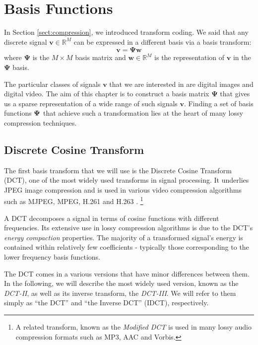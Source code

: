 \chapter{Basis Functions}
\label{ch:dwt}
In Section \ref{sect:compression}, we introduced transform coding.
We said that any discrete signal $\bm v \in \mathbb{R}^M$ can be expressed in a different basis via a basis transform:
\begin{equation*}
  \bm v = \bm\Psi\bm w
\end{equation*}
where $\bm\Psi$ is the $M\times M$ basis matrix and $\bm w \in\mathbb{R}^M$ is the representation of $\bm v$ in the $\bm\Psi$ basis.

The particular classes of signals $\bm v$ that we are interested in are digital images and digital video.
The aim of this chapter is to construct a basis matrix $\bm\Psi$ that gives us a sparse representation of a wide range of such signals $\bm v$.
Finding a set of basis functions $\boldsymbol\Psi$ that achieve such a transformation lies at the heart of many lossy compression techniques.

\section{Discrete Cosine Transform}
\label{sect:dct}
The first basis transform that we will use is the Discrete Cosine Transform (DCT), one of the most widely used transforms in signal processing.
It underlies JPEG image compression and is used in various video compression algorithms such as MJPEG, MPEG, H.261 and H.263 \cite{zeng2013}.
\footnote{A related transform, known as the \emph{Modified DCT} is used in many lossy audio compression formats such as MP3, AAC and Vorbis.}

A DCT decomposes a signal in terms of cosine functions with different frequencies.
Its extensive use in lossy compression algorithms is due to the DCT's \emph{energy compaction} properties.
The majority of a transformed signal's energy is contained within relatively few coefficients - typically those corresponding to the lower frequency basis functions.

The DCT comes in a various versions that have minor differences between them.
In the following, we will describe the most widely used version, known as the \emph{DCT-II}, as well as its inverse transform, the \emph{DCT-III}.
We will refer to them simply as ``the DCT'' and ``the Inverse DCT'' (IDCT), respectively.

